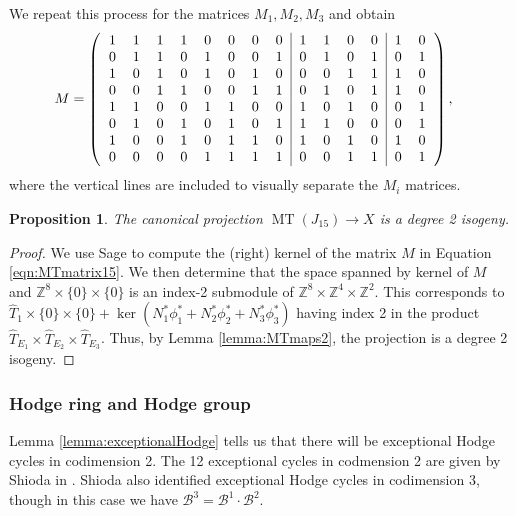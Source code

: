 \documentclass[reqno, oneside, 12pt]{amsart}
\DeclareMathOperator{\MT}{MT}
\newcommand{\Z}{\mathbb{Z}}
\newtheorem{proposition}[theorem]{Proposition}
\theoremstyle{remark}
\numberwithin{equation}{section}
\begin{document}
We repeat this process for  the matrices $M_1, M_2,M_3$ and obtain
\begin{align}\label{eqn:MTmatrix15}
M&=\left(\begin{tabular}{cccccccc|cccc|cc}
1 &1 &1 &1 &0 &0 &0 &0  &1 &1 &0 &0     &1 &0\\
0 &1 &1 &0 &1 &0 &0 &1  &0 &1 &0 &1     &0 &1\\
1& 0& 1& 0& 1& 0& 1& 0  &0& 0& 1& 1     & 1& 0\\
0& 0& 1& 1& 0& 0& 1& 1  & 0& 1& 0& 1    & 1& 0\\
1& 1& 0& 0& 1& 1& 0& 0  & 1& 0& 1& 0    & 0& 1\\
0& 1& 0& 1& 0& 1& 0& 1  & 1& 1& 0& 0    & 0& 1\\
1& 0& 0& 1& 0& 1& 1& 0  & 1& 0& 1& 0    & 1& 0\\
0& 0& 0& 0& 1& 1& 1& 1  & 0& 0& 1& 1    & 0& 1\\
\end{tabular}\right),
\end{align}
where the vertical lines are included to visually separate the $M_i$ matrices. 

\begin{proposition}\label{prop:MT15isogeny}
The canonical projection $\MT(J_{15})\rightarrow X$ is a degree 2 isogeny.
\end{proposition}
\begin{proof}
We use Sage to  compute the (right) kernel of the matrix $M$ in Equation \eqref{eqn:MTmatrix15}. We then determine that the space spanned by kernel of $M$ and $\Z^8\times \{0\}\times \{0\}$ is an index-2 submodule of $\Z^{8}\times\Z^4\times \Z^2$. This corresponds to $\widehat{T}_1\times \{0\}\times\{0\} + \ker (N_1^* \phi_1^* + N_2^*\phi_2^*+ N_3^*\phi_3^*)$ having index 2 in the product $ \widehat{T}_{E_1} \times \widehat{T}_{E_2} \times \widehat{T}_{E_3}$. Thus, by Lemma \ref{lemma:MTmaps2}, the projection is a degree 2 isogeny. 
\end{proof}


\subsubsection{Hodge ring and Hodge group}
Lemma \ref{lemma:exceptionalHodge} tells us that there will be exceptional Hodge cycles in codimension 2. The 12 exceptional cycles in codmension 2 are given by Shioda in \cite[Section 6.2]{Shioda82}. Shioda also identified exceptional Hodge cycles in codimension  3, though in this case we have $\mathscr B^3=\mathscr B^1\cdot\mathscr B^2$.
\end{document}
